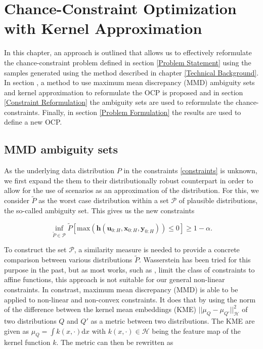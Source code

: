 \chapter{Chance-Constraint Optimization with Kernel Approximation} \label{Technical Approach}

In this chapter, an approach is outlined that allows us to effectively reformulate the chance-constraint problem defined in section \ref{Problem Statement} using the samples generated using the method described in chapter \ref{Technical Background}. In section \label{SubSec:MMD}, a method to use maximum mean discrepancy (MMD) ambiguity sets and kernel approximation to reformulate the OCP is proposed and in section \ref{Constraint Reformulation} the ambiguity sets are used to reformulate the chance-constraints. Finally, in section \ref{Problem Formulation} the results are used to define a new OCP.

\section{MMD ambiguity sets} \label{SubSec:MMD}

As the underlying data distribution $P$ in the constraints \eqref{constraints} is unknown, we first expand the them to their distributionally robust counterpart in order to allow for the use of scenarios as an approximation of the distribution. For this, we consider $\tilde{P}$ as the worst case distribution within a set $\mathcal{P}$ of plausible distributions, the so-called ambiguity set. This gives us the new constraints

\begin{equation} \label{wc constraints}
\inf\limits_{\tilde{P} \in \mathcal{P}}\tilde{P} \left[ \text{max}(\boldsymbol{h}(\boldsymbol{u}_{0:H},  \boldsymbol{x}_{0:H},  \boldsymbol{y}_{0:H})) \leq 0 \right] \geq 1 - \alpha.
\end{equation}

To construct the set $\mathcal{P}$, a similarity measure is needed to provide a concrete comparison between various distributions $\tilde{P}$. Wasserstein has been tried for this purpose in the past, but as most works, such as \cite{Hota_19}, limit the class of constraints to affine functions, this approach is not suitable for our general non-linear constraints. In constrast, maximum mean discrepancy (MMD) \cite{Arthur_12} is able to be applied to non-linear and non-convex constraints. It does that by using the norm of the difference between the kernel mean embeddings (KME) $|| \mu_Q - \mu_{Q'} ||^2_{\mathcal{H}}$ of two distributions $Q$ and $Q'$ as a metric between two distributions. The KME are given as $\mu_Q = \int k(x, \cdot) \text{d}x$ with $k(x, \cdot) \in \mathcal{H}$ being the feature map of the kernel function $k$. The metric can then be rewritten as 

